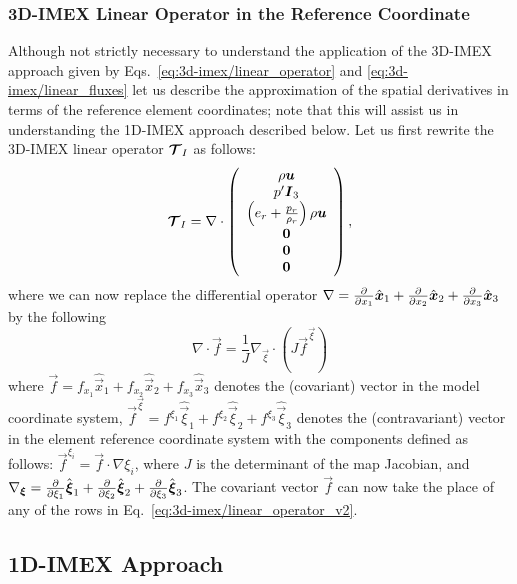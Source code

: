 \documentclass{report}
\begin{document}
\subsubsection{3D-IMEX Linear Operator in the Reference Coordinate}
 Although not strictly necessary to understand the application of the 3D-IMEX approach given by Eqs.\ \eqref{eq:3d-imex/linear_operator} and \eqref{eq:3d-imex/linear_fluxes} let us describe the approximation of the spatial derivatives in terms of the reference element coordinates; note that this will assist us in understanding the 1D-IMEX approach described below. Let us first rewrite the 3D-IMEX linear operator 
 $\boldsymbol{{\mathcal{T}}}_{I}$ as follows:
 \begin{equation}
 \boldsymbol{{\mathcal{T}}}_{I}= \nabla \cdot \left( \begin{array}{c}
 \rho \boldsymbol{{u}} \\
 p' \boldsymbol{{I}}_3 \\
 \left( e_r + \frac{p_r}{\rho_r} \right) \rho \boldsymbol{{u}} \\
\boldsymbol{{0}}\\
\boldsymbol{{0}} \\
\boldsymbol{{0}}
\end{array}
\right), 
\label{eq:3d-imex/linear_operator_v2}
\end{equation}
 where we can now replace the differential operator $\nabla=\frac{\partial }{\partial x_1} \hat{\boldsymbol{{x}}}_1 + \frac{\partial }{\partial x_2} \hat{\boldsymbol{{x}}}_2 + \frac{\partial }{\partial x_3} \hat{\boldsymbol{{x}}}_3$
 by the following
 \[
 \nabla \cdot \vec{f} = \frac{1}{J} \nabla_{\vec{\xi}} \cdot \left(J \vec{f}^{\vec{\xi}} \right)
 \]
 where $\vec{f}=f_{x_1} \hat{\vec{x}}_1 + f_{x_2} \hat{\vec{x}}_2 + f_{x_3} \hat{\vec{x}}_3$ denotes the (covariant) vector in the model coordinate system, 
 $\vec{f}^{\vec{\xi}}=f^{\xi_1} \hat{\vec{\xi}}_1 + f^{\xi_2} \hat{\vec{\xi}}_2 + f^{\xi_3} \hat{\vec{\xi}}_3$ denotes the (contravariant) vector in the element reference coordinate system with the components defined as follows:
 $\vec{f}^{\xi_i}=\vec{f} \cdot \nabla \xi_i$, where $J$ is the determinant of the map Jacobian, and 
 $\nabla_{\boldsymbol{{\xi}}}=\frac{\partial }{\partial \xi_1} \hat{\boldsymbol{{\xi}}}_1 + \frac{\partial }{\partial \xi_2} \hat{\boldsymbol{{\xi}}}_2 + \frac{\partial }{\partial \xi_3} \hat{\boldsymbol{{\xi}}}_3$. The covariant vector $\vec{f}$ can now take the place of any of the rows in Eq.\ \eqref{eq:3d-imex/linear_operator_v2}.
 
\subsection{1D-IMEX Approach}
\label{sec:1D-IMEX}
\end{document}
